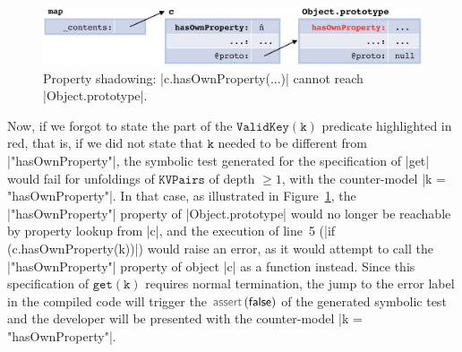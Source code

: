 \begin{figure}[t!]
\centering
\includegraphics[width=\linewidth]{figures/heapfail.png}
\caption{Property shadowing: \jsinline|c.hasOwnProperty(...)| cannot reach \jsinline|Object.prototype|.} 
\label{fig:cexget}
\vspace{-0.5cm}
\end{figure}

Now, if we forgot to state the part of the $\mathtt{ValidKey(k)}$ predicate highlighted in red, that is, if we did not state that $\mathtt{k}$ needed to be different from \jsinline|"hasOwnProperty"|, the symbolic test generated for the specification of \jsinline|get| would fail for unfoldings of $\mathtt{KVPairs}$ of depth $\geq 1$, with the counter-model \jsinline|k = "hasOwnProperty"|. 
In that case, as illustrated in Figure~\ref{fig:cexget}, the \jsinline|"hasOwnProperty"| property of \jsinline|Object.prototype| would no longer be reachable by property lookup from \jsinline|c|, and
the execution of line~5 (\jsinline|if (c.hasOwnProperty(k))|) would raise an error, as it would attempt to call the \jsinline|"hasOwnProperty"| property of object \jsinline|c| as a function instead. 
Since this specification of $\mathtt{get(k)}$ requires normal termination, the jump to the error label in the compiled \jsil code will trigger the $\assert(\jfalse)$ of the generated symbolic test and the developer will be presented with the counter-model \jsinline|k = "hasOwnProperty"|.

\begin{center}
\end{center}
